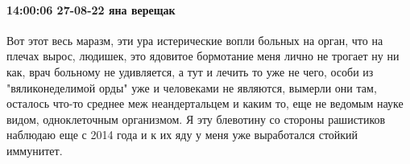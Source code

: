  
 
 
 
 

\paragraph{14:00:06 27-08-22 яна верещак}

Вот этот весь маразм, эти ура истерические вопли больных на орган, что на
плечах вырос, людишек, это ядовитое бормотание меня лично не трогает ну ни как,
врач больному не удивляется, а тут и лечить то уже не чего, особи из
"вяликонеделимой орды" уже и человеками не являются, вымерли они там, осталось
что-то среднее меж неандертальцем и каким то, еще не ведомым науке видом,
одноклеточным организмом. Я эту блевотину со стороны рашистиков наблюдаю еще с
2014 года и к их яду у меня уже выработался стойкий иммунитет.


